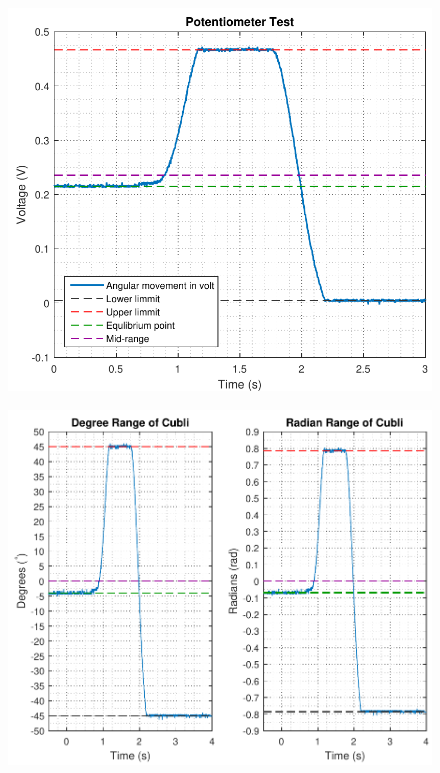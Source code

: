 \begin{minipage}{\linewidth}
  	\begin{minipage}{0.45\linewidth}
  		\begin{figure}[H]
  			\includegraphics[scale=.5]{figures/PotentiometerResolution}
  			\centering
  			\captionsetup{justification=centering}
  			\label{PotentiometerResolution}
  		\end{figure}\vspace{-5mm}
  	\end{minipage}
  	\hspace{0.03\linewidth}
  	\begin{minipage}{0.45\linewidth}
  		\begin{figure}[H]
  		\vspace{.5cm}
  			\includegraphics[scale=.5]{figures/PotentiometerResolutionDegRad}

\end{figure}
\end{minipage}
\end{minipage}
